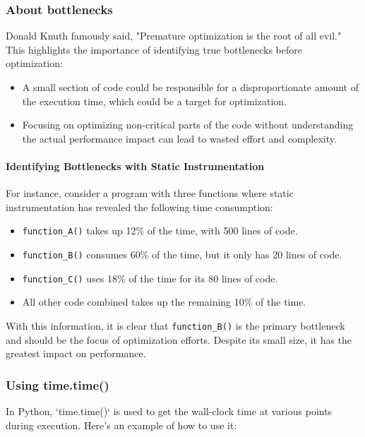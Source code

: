 \documentclass[12pt]{article}
\begin{document}
\subsubsection{About bottlenecks}

Donald Knuth famously said, "Premature optimization is the root of all evil." This highlights the importance of identifying true bottlenecks before optimization:

\begin{itemize}
    \item A small section of code could be responsible for a disproportionate amount of the execution time, which could be a target for optimization.
    \item Focusing on optimizing non-critical parts of the code without understanding the actual performance impact can lead to wasted effort and complexity.
\end{itemize}

\paragraph{Identifying Bottlenecks with Static Instrumentation}
For instance, consider a program with three functions where static instrumentation has revealed the following time consumption:

\begin{itemize}
    \item \texttt{function\_A()} takes up 12\% of the time, with 500 lines of code.
    \item \texttt{function\_B()} consumes 60\% of the time, but it only has 20 lines of code.
    \item \texttt{function\_C()} uses 18\% of the time for its 80 lines of code.
    \item All other code combined takes up the remaining 10\% of the time.
\end{itemize}

With this information, it is clear that \texttt{function\_B()} is the primary bottleneck and should be the focus of optimization efforts. Despite its small size, it has the greatest impact on performance.


\subsubsection{Using time.time()}
In Python, `time.time()` is used to get the wall-clock time at various points during execution. Here's an example of how to use it:
\end{document}
